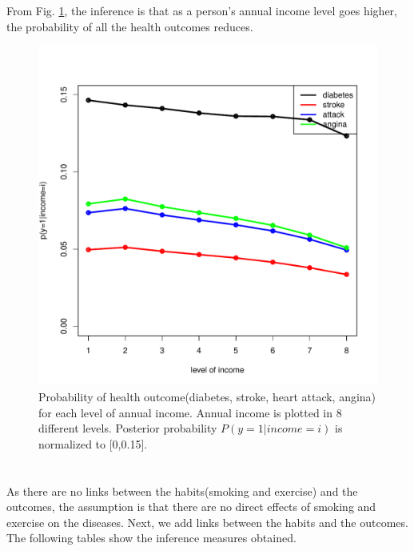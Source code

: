 \documentclass[11pt]{article}
\begin{document}
\section{}
\label{3}
\vspace{-20pt}
  From Fig. \ref{fig3}, the inference is that as a person's annual income level goes higher, the probability of all the health outcomes reduces.
\begin{figure}[!h]
\begin{center}
  \includegraphics[scale=0.6]{3_plots}
\end{center}
\vspace{-20pt}
\caption{\small{Probability of health outcome(diabetes, stroke, heart attack, angina) for each level of annual income. Annual income is plotted in 8 different levels.  Posterior  probability $P(y=1|income=i)$ is normalized to [0,0.15]. }}
\label{fig3}
\end{figure}

\section{} 
\label{4}

As there are no links between the habits(smoking and exercise) and the outcomes, the assumption is that there are no direct effects of smoking and exercise on the diseases. Next, we add links between the habits and the outcomes. The following tables show the inference measures obtained.
\end{document}
